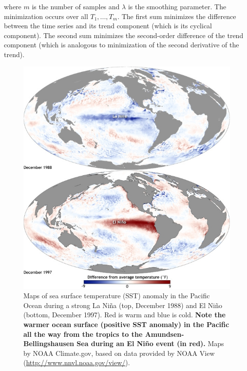 \noindent
where $m$ is the number of samples and $\lambda$ is the smoothing parameter. The minimization occurs over all $T_1, ..., T_m$. The first sum minimizes the difference between the time series and its trend component (which is its cyclical component). The second sum minimizes the second-order difference of the trend component (which is analogous to minimization of the second derivative of the trend).\\[.5cm]


\begin{figure}[!ht]
  \centering
  \includegraphics[width=.76\textwidth]{img/enso.jpg}
  \caption[Sea surface temperature during El Ni\~no/La Ni\~na]{
Maps of sea surface temperature (SST) anomaly in the Pacific Ocean during a strong La Ni\~na (top, December 1988) and El Ni\~no (bottom, December 1997). Red is warm and blue is cold. {\bf Note the warmer ocean surface (positive SST anomaly) in the Pacific all the way from the tropics to the Amundsen-Bellingshausen Sea during an El Ni\~no event (in red).} Maps by NOAA Climate.gov, based on data provided by NOAA View (\url{http://www.nnvl.noaa.gov/view/}).
  }
  \label{fig:map-enso}
\end{figure}


